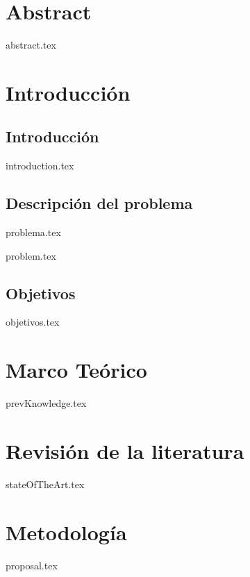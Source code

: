 \documentclass{report}
\begin{document}
\chapter*{Abstract}
{abstract.tex}

\tableofcontents

\chapter{Introducción}

\section{Introducción}
{introduction.tex}

\section{Descripción del problema}
{problema.tex}

{problem.tex}

\section{Objetivos}
{objetivos.tex}

\chapter{Marco Teórico}
{prevKnowledge.tex}

\chapter{Revisión de la literatura}
{stateOfTheArt.tex}


\chapter{Metodología}
{proposal.tex}
\end{document}

